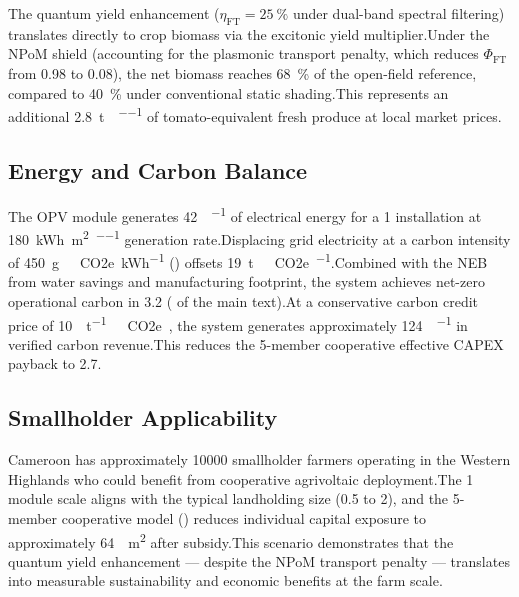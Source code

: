 \documentclass[11pt,a4paper]{article}
\begin{document}
The quantum yield enhancement ($\eta_{\mathrm{FT}} = \SI{25}{\percent}$ under dual-band spectral filtering) translates directly to crop biomass via the excitonic yield multiplier.\newline Under the NPoM shield (accounting for the plasmonic transport penalty, which reduces $\Phi_{\mathrm{FT}}$ from \num{0.98} to \num{0.08}), the net biomass reaches \SI{68}{\percent} of the open-field reference, compared to \SI{40}{\percent} under conventional static shading.\newline This represents an additional \SI{2.8}{\tonne\per\ha\per\yr} of tomato-equivalent fresh produce at local market prices.

\subsection{Energy and Carbon Balance}

The OPV module generates \SI{42}{\MWh\per\yr} of electrical energy for a \SI{1}{\ha} installation at \SI{180}{\kWh\per\m\squared\per\yr} generation rate.\newline Displacing grid electricity at a carbon intensity of \SI{450}{\g\ CO2e\per\kWh} () offsets \SI{19}{\tonne\ CO2e\per\yr}.\newline Combined with the NEB from water savings and manufacturing footprint, the system achieves net-zero operational carbon in \SI{3.2}{\yr} ( of the main text).\newline At a conservative carbon credit price of \SI{10}{\USD\per\tonne\ CO2e}~\cite{ICVCM2024}, the system generates approximately \SI{124}{\USD\per\yr} in verified carbon revenue.\newline This reduces the 5-member cooperative effective CAPEX payback to \SI{2.7}{\yr}.

\subsection{Smallholder Applicability}

Cameroon has approximately \num{10000} smallholder farmers operating in the Western Highlands who could benefit from cooperative agrivoltaic deployment.\newline The \SI{1}{\ha} module scale aligns with the typical landholding size (\SI{0.5}{\ha} to \SI{2}{\ha}), and the 5-member cooperative model () reduces individual capital exposure to approximately \SI{64}{\per\m\squared} after subsidy.\newline This scenario demonstrates that the quantum yield enhancement --- despite the NPoM transport penalty --- translates into measurable sustainability and economic benefits at the farm scale.




\end{document}
